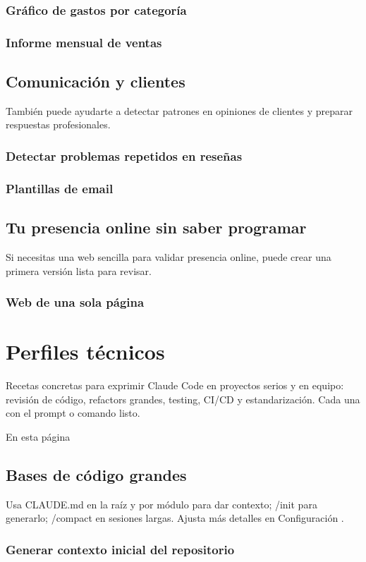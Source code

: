 \documentclass[11pt,a4paper]{book}
\begin{document}
\subsection{Gráfico de gastos por categoría}
\subsection{Informe mensual de ventas}
\section{Comunicación y clientes}
También puede ayudarte a detectar patrones en opiniones de clientes y preparar respuestas profesionales.

\subsection{Detectar problemas repetidos en reseñas}
\subsection{Plantillas de email}
\section{Tu presencia online sin saber programar}
Si necesitas una web sencilla para validar presencia online, puede crear una primera versión lista para revisar.

\subsection{Web de una sola página}
\chapter{Perfiles técnicos}
Recetas concretas para exprimir Claude Code en proyectos serios y en equipo: revisión de código, refactors grandes, testing, CI/CD y estandarización. Cada una con el prompt o comando listo.

En esta página

\section{Bases de código grandes}
Usa CLAUDE.md en la raíz y por módulo para dar contexto; /init para generarlo; /compact en sesiones largas. Ajusta más detalles en Configuración .

\subsection{Generar contexto inicial del repositorio}
\end{document}
